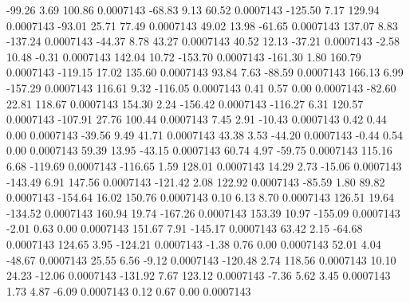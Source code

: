       -99.26        3.69      100.86     0.0007143
      -68.83        9.13       60.52     0.0007143
     -125.50        7.17      129.94     0.0007143
      -93.01       25.71       77.49     0.0007143
       49.02       13.98      -61.65     0.0007143
      137.07        8.83     -137.24     0.0007143
      -44.37        8.78       43.27     0.0007143
       40.52       12.13      -37.21     0.0007143
       -2.58       10.48       -0.31     0.0007143
      142.04       10.72     -153.70     0.0007143
     -161.30        1.80      160.79     0.0007143
     -119.15       17.02      135.60     0.0007143
       93.84        7.63      -88.59     0.0007143
      166.13        6.99     -157.29     0.0007143
      116.61        9.32     -116.05     0.0007143
        0.41        0.57        0.00     0.0007143
      -82.60       22.81      118.67     0.0007143
      154.30        2.24     -156.42     0.0007143
     -116.27        6.31      120.57     0.0007143
     -107.91       27.76      100.44     0.0007143
        7.45        2.91      -10.43     0.0007143
        0.42        0.44        0.00     0.0007143
      -39.56        9.49       41.71     0.0007143
       43.38        3.53      -44.20     0.0007143
       -0.44        0.54        0.00     0.0007143
       59.39       13.95      -43.15     0.0007143
       60.74        4.97      -59.75     0.0007143
      115.16        6.68     -119.69     0.0007143
     -116.65        1.59      128.01     0.0007143
       14.29        2.73      -15.06     0.0007143
     -143.49        6.91      147.56     0.0007143
     -121.42        2.08      122.92     0.0007143
      -85.59        1.80       89.82     0.0007143
     -154.64       16.02      150.76     0.0007143
        0.10        6.13        8.70     0.0007143
      126.51       19.64     -134.52     0.0007143
      160.94       19.74     -167.26     0.0007143
      153.39       10.97     -155.09     0.0007143
       -2.01        0.63        0.00     0.0007143
      151.67        7.91     -145.17     0.0007143
       63.42        2.15      -64.68     0.0007143
      124.65        3.95     -124.21     0.0007143
       -1.38        0.76        0.00     0.0007143
       52.01        4.04      -48.67     0.0007143
       25.55        6.56       -9.12     0.0007143
     -120.48        2.74      118.56     0.0007143
       10.10       24.23      -12.06     0.0007143
     -131.92        7.67      123.12     0.0007143
       -7.36        5.62        3.45     0.0007143
        1.73        4.87       -6.09     0.0007143
        0.12        0.67        0.00     0.0007143
